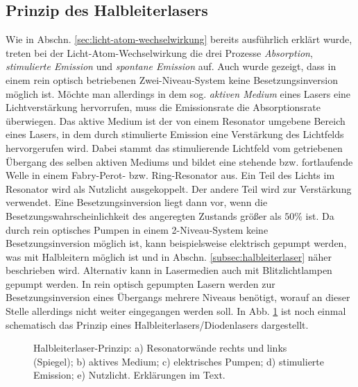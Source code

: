 \subsection{Prinzip des Halbleiterlasers}\label{subsec:prinzip_halbleiterlaser}
Wie in Abschn. \ref{sec:licht-atom-wechselwirkung} bereits ausführlich erklärt
wurde, treten bei der Licht-Atom-Wechselwirkung die drei Prozesse
\textit{Absorption}, \textit{stimulierte Emission} und \textit{spontane Emission} auf. Auch wurde
gezeigt, dass in einem rein optisch betriebenen Zwei-Niveau-System keine
Besetzungsinversion möglich ist.
Möchte man allerdings in dem sog. \textit{aktiven Medium} eines Lasers eine Lichtverstärkung
hervorrufen, muss die Emissionsrate die Absorptionsrate überwiegen. Das aktive Medium ist der von einem Resonator
umgebene Bereich eines Lasers, in dem durch stimulierte Emission eine
Verstärkung des Lichtfelds hervorgerufen wird. Dabei stammt das stimulierende
Lichtfeld vom getriebenen Übergang des selben aktiven Mediums und bildet eine
stehende bzw. fortlaufende Welle in einem Fabry-Perot- bzw. Ring-Resonator aus.
Ein Teil des Lichts im Resonator wird als Nutzlicht ausgekoppelt. Der andere Teil wird zur Verstärkung verwendet. Eine
Besetzungsinversion liegt dann vor, wenn die Besetzungswahrscheinlichkeit des
angeregten Zustands größer als $50\%$ ist.
Da durch rein optisches Pumpen in einem
2-Niveau-System keine Besetzungsinversion möglich ist, kann beispielsweise
elektrisch gepumpt werden, was mit Halbleitern möglich ist und in Abschn.
\ref{subsec:halbleiterlaser} näher beschrieben wird. Alternativ kann in
Lasermedien auch mit Blitzlichtlampen gepumpt werden. In rein optisch gepumpten
Lasern werden zur Besetzungsinversion eines Übergangs mehrere Niveaus benötigt,
worauf an dieser Stelle allerdings nicht weiter eingegangen werden soll. In Abb.
\ref{fig:halbleiterlaser-prinzip} ist noch einmal schematisch das Prinzip eines
Halbleiterlasers/Diodenlasers dargestellt.
\begin{figure}[h]
	\centering
	\caption[Halbleiterlaser Prinzip]{Halbleiterlaser-Prinzip: a) Resonatorwände
	rechts und links (Spiegel); b) aktives Medium; c) elektrisches Pumpen; d)
	stimulierte Emission; e) Nutzlicht.
	Erklärungen im Text.}
	\label{fig:halbleiterlaser-prinzip}
\end{figure}

